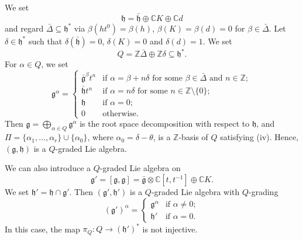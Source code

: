 \documentclass{beamer}
\begin{document}
\begin{frame}
  We set
  \begin{equation*}
    \mathfrak{h} = \bar{\mathfrak{h}} \oplus \mathbb{C}K \oplus \mathbb{C}d
  \end{equation*}
  and regard $\bar{\Delta} \subseteq \mathfrak{h}^*$ via $\beta(ht^0) = \beta(h)$, $\beta(K) = \beta(d) = 0$ for $\beta \in \bar{\Delta}$.
  Let $\delta \in \mathfrak{h}^*$ such that $\delta(\bar{\mathfrak{h}}) = 0$, $\delta(K) = 0$ and $\delta(d) = 1$.
  We set
  \begin{equation*}
    Q = \mathbb{Z}\bar{\Delta} \oplus \mathbb{Z}\delta \subseteq \mathfrak{h}^*.
  \end{equation*}
  For $\alpha \in Q$, we set
  \begin{equation*}
    \mathfrak{g}^{\alpha} =
    \begin{cases}
      \bar{\mathfrak{g}}^{\beta}t^n &\text{if $\alpha = \beta + n\delta$ for some $\beta \in \bar{\Delta}$ and $n \in \mathbb{Z}$}; \\
      \bar{\mathfrak{h}}t^n &\text{if $\alpha = n\delta$ for some $n \in \mathbb{Z} \setminus \{0\}$}; \\
      \mathfrak{h} &\text{if $\alpha = 0$}; \\
      0 &\text{otherwise}.
    \end{cases}
  \end{equation*}
  Then $\mathfrak{g} = \bigoplus_{\alpha \in Q}\mathfrak{g}^{\alpha}$ is the root space decomposition with respect to $\mathfrak{h}$, and $\Pi = \{\alpha_1, \dots, \alpha_r\} \cup \{\alpha_0\}$, where $\alpha_0 = \delta - \theta$, is a $\mathbb{Z}$-basis of $Q$ satisfying (iv).
  Hence, $(\mathfrak{g}, \mathfrak{h})$ is a $Q$-graded Lie algebra.
\end{frame}

\begin{frame}
  We can also introduce a $Q$-graded Lie algebra on
  \begin{equation*}
    \mathfrak{g}' = [\mathfrak{g}, \mathfrak{g}] = \bar{\mathfrak{g}} \otimes \mathbb{C}[t, t^{-1}] \oplus \mathbb{C}K.
  \end{equation*}
  We set $\mathfrak{h}' = \mathfrak{h} \cap \mathfrak{g}'$.
  Then $(\mathfrak{g}', \mathfrak{h}')$ is a $Q$-graded Lie algebra with $Q$-grading
  \begin{equation*}
    (\mathfrak{g}')^{\alpha} =
    \begin{cases}
      \mathfrak{g}^{\alpha} &\text{if $\alpha \neq 0$}; \\
      \mathfrak{h}' &\text{if $\alpha = 0$}.
    \end{cases}
  \end{equation*}
  In this case, the map $\pi_Q: Q \to (\mathfrak{h}')^*$ is not injective.
\end{frame}
\end{document}
